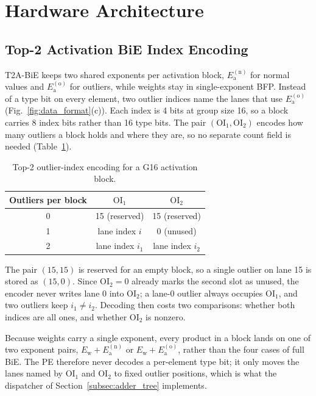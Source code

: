 \section{Hardware Architecture}
\label{sec:architecture}

\subsection{Top-2 Activation BiE Index Encoding}
\label{subsec:t2a_encode}
T2A-BiE keeps two shared exponents per activation block, $E_{\mathrm{a}}^{\mathrm{(n)}}$ for normal values and $E_{\mathrm{a}}^{\mathrm{(o)}}$ for outliers, while weights stay in single-exponent BFP.
Instead of a type bit on every element, two outlier indices name the lanes that use $E_{\mathrm{a}}^{\mathrm{(o)}}$ (Fig.~\ref{fig:data_format}(c)).
Each index is 4 bits at group size 16, so a block carries 8 index bits rather than 16 type bits.
The pair $(\mathrm{OI}_1,\mathrm{OI}_2)$ encodes how many outliers a block holds and where they are, so no separate count field is needed (Table~\ref{tab:oi_encode}).

\begin{table}[H]
    \centering
    \caption{Top-2 outlier-index encoding for a G16 activation block.}
    \label{tab:oi_encode}
    \begin{tabular*}{\columnwidth}{@{\extracolsep{\fill}}ccc}
        \toprule
        Outliers per block & $\mathrm{OI}_1$ & $\mathrm{OI}_2$ \\
        \midrule
        0 & 15 (reserved) & 15 (reserved) \\
        1 & lane index $i$ & 0 (unused) \\
        2 & lane index $i_1$ & lane index $i_2$ \\
        \bottomrule
    \end{tabular*}
\end{table}

The pair $(15,15)$ is reserved for an empty block, so a single outlier on lane 15 is stored as $(15,0)$.
Since $\mathrm{OI}_2=0$ already marks the second slot as unused, the encoder never writes lane 0 into $\mathrm{OI}_2$; a lane-0 outlier always occupies $\mathrm{OI}_1$, and two outliers keep $i_1 \neq i_2$.
Decoding then costs two comparisons: whether both indices are all ones, and whether $\mathrm{OI}_2$ is nonzero.

Because weights carry a single exponent, every product in a block lands on one of two exponent pairs, $E_{\mathrm{w}}+E_{\mathrm{a}}^{\mathrm{(n)}}$ or $E_{\mathrm{w}}+E_{\mathrm{a}}^{\mathrm{(o)}}$, rather than the four cases of full BiE.
The PE therefore never decodes a per-element type bit; it only moves the lanes named by $\mathrm{OI}_1$ and $\mathrm{OI}_2$ to fixed outlier positions, which is what the dispatcher of Section~\ref{subsec:adder_tree} implements.

